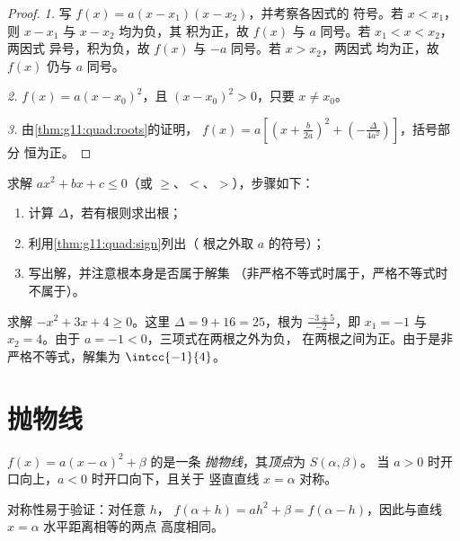 \begin{proof}
\emph{1.} 写 $f(x) = a(x-x_1)(x-x_2)$，并考察各因式的
符号。若 $x < x_1$，则 $x - x_1$ 与 $x - x_2$ 均为负，其
积为正，故 $f(x)$ 与 $a$ 同号。若 $x_1 < x < x_2$，两因式
异号，积为负，故 $f(x)$ 与 $-a$ 同号。若 $x > x_2$，两因式
均为正，故 $f(x)$ 仍与
$a$ 同号。

\emph{2.} $f(x) = a(x - x_0)^2$，且 $(x-x_0)^2 > 0$，只要 $x \neq x_0$。

\emph{3.} 由\cref{thm:g11:quad:roots}的证明，
$f(x) = a\left[\left(x + \frac{b}{2a}\right)^2 +
\left(-\frac{\Delta}{4a^2}\right)\right]$，括号部分
恒为正。
\end{proof}

\begin{method}[解二次不等式]\label{met:g11:quad:inequalities}
求解 $ax^2 + bx + c \leq 0$（或 $\geq$、$<$、$>$），步骤如下：
\begin{enumerate}
  \item 计算 $\Delta$，若有根则求出根；
  \item 利用\cref{thm:g11:quad:sign}列出（
        根之外取 $a$ 的符号）；
  \item 写出解，并注意根本身是否属于解集
        （非严格不等式时属于，严格不等式时不属于）。
\end{enumerate}
\end{method}

\begin{example}\label{ex:g11:quad:inequality}
求解 $-x^2 + 3x + 4 \geq 0$。这里 $\Delta = 9 + 16 = 25$，根为
$\frac{-3 \pm 5}{-2}$，即 $x_1 = -1$ 与 $x_2 = 4$。由于
$a = -1 < 0$，三项式在两根之外为负，
在两根之间为正。由于是非严格不等式，解集为
$\intcc{-1}{4}$。
\end{example}

\section{抛物线}

\begin{definition}[抛物线]\label{def:g11:quad:parabola}
 $f(x) = a(x-\alpha)^2+\beta$ 的是一条
\emph{抛物线}，其\emph{顶点}为 $S(\alpha, \beta)$。
当 $a > 0$ 时开口向上，$a < 0$ 时开口向下，且关于
竖直直线 $x = \alpha$ 对称。
\end{definition}

\begin{remark}
对称性易于验证：对任意 $h$，
$f(\alpha + h) = ah^2 + \beta = f(\alpha - h)$，因此与直线 $x = \alpha$ 水平距离相等的两点
高度相同。
\end{remark}

